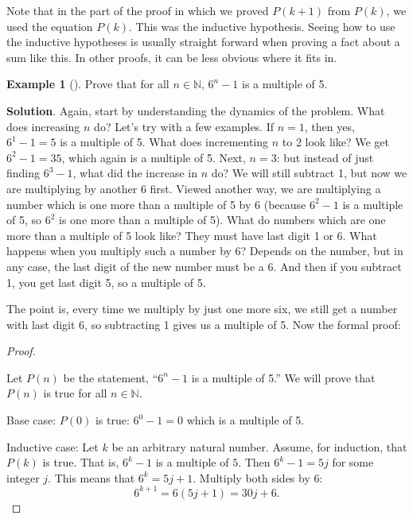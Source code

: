 \documentclass[10pt,]{book}
\theoremstyle{plain}
\theoremstyle{definition}
\theoremstyle{definition}
\newtheorem{example}[theorem]{Example}
\theoremstyle{definition}
\theoremstyle{definition}
\numberwithin{equation}{chapter}
\def\N{\mathbb N}
\begin{document}
\hypertarget{p-2232}{}%
Note that in the part of the proof in which we proved \(P(k+1)\) from \(P(k)\), we used the equation \(P(k)\). This was the inductive hypothesis. Seeing how to use the inductive hypotheses is usually straight forward when proving a fact about a sum like this. In other proofs, it can be less obvious where it fits in.%
\begin{example}[]\label{example-75}
\hypertarget{p-2233}{}%
Prove that for all \(n \in \N\), \(6^n - 1\) is a multiple of 5.%
\par\smallskip%
\noindent\textbf{Solution}.\hypertarget{solution-199}{}\quad%
\hypertarget{p-2234}{}%
Again, start by understanding the dynamics of the problem. What does increasing \(n\) do? Let's try with a few examples. If \(n = 1\), then yes, \(6^1 - 1 = 5\) is a multiple of 5. What does incrementing \(n\) to 2 look like? We get \(6^2 - 1 = 35\), which again is a multiple of 5. Next, \(n = 3\): but instead of just finding \(6^3 - 1\), what did the increase in \(n\) do? We will still subtract 1, but now we are multiplying by another 6 first. Viewed another way, we are multiplying a number which is one more than a multiple of 5 by 6 (because \(6^2 - 1\) is a multiple of 5, so \(6^2\) is one more than a multiple of 5). What do numbers which are one more than a multiple of 5 look like? They must have last digit 1 or 6. What happens when you multiply such a number by 6? Depends on the number, but in any case, the last digit of the new number must be a 6. And then if you subtract 1, you get last digit 5, so a multiple of 5.%
\par
\hypertarget{p-2235}{}%
The point is, every time we multiply by just one more six, we still get a number with last digit 6, so subtracting 1 gives us a multiple of 5. Now the formal proof:%
\begin{proof}\hypertarget{proof-39}{}
\hypertarget{p-2236}{}%
Let \(P(n)\) be the statement, ``\(6^n - 1\) is a multiple of 5.'' We will prove that \(P(n)\) is true for all \(n \in \N\).%
\par
\hypertarget{p-2237}{}%
Base case: \(P(0)\) is true: \(6^0 -1 = 0\) which is a multiple of 5.%
\par
\hypertarget{p-2238}{}%
Inductive case: Let \(k\) be an arbitrary natural number. Assume, for induction, that \(P(k)\) is true. That is, \(6^k - 1\) is a multiple of \(5\). Then \(6^k - 1 = 5j\) for some integer \(j\). This means that \(6^k = 5j + 1\). Multiply both sides by \(6\):%
\begin{equation*}
6^{k+1} = 6(5j+1) = 30j + 6.

\end{equation*}
\end{proof}
\end{example}
\end{document}
